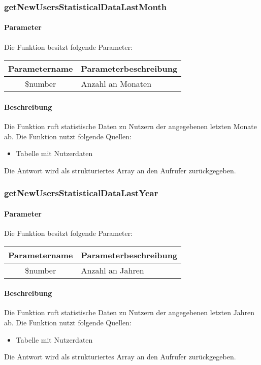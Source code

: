 \subsubsection{getNewUsersStatisticalDataLastMonth}
\paragraph{Parameter} Die Funktion besitzt folgende Parameter:
\begin{table}[H]
	\begin{tabular}{|c|p{11cm}|}
		\hline
		\textbf{Parametername} & \textbf{Parameterbeschreibung} \\ \hline
		\$number & Anzahl an Monaten \\ \hline
	\end{tabular}
\end{table}
\paragraph{Beschreibung} Die Funktion ruft statistische Daten zu Nutzern der angegebenen letzten Monate ab. Die Funktion nutzt folgende Quellen:
\begin{itemize}
	\item Tabelle mit Nutzerdaten
\end{itemize}
Die Antwort wird als strukturiertes Array an den Aufrufer zurückgegeben.
\subsubsection{getNewUsersStatisticalDataLastYear}
\paragraph{Parameter} Die Funktion besitzt folgende Parameter:
\begin{table}[H]
	\begin{tabular}{|c|p{11cm}|}
		\hline
		\textbf{Parametername} & \textbf{Parameterbeschreibung} \\ \hline
		\$number & Anzahl an Jahren \\ \hline
	\end{tabular}
\end{table}
\paragraph{Beschreibung} Die Funktion ruft statistische Daten zu Nutzern der angegebenen letzten Jahren ab. Die Funktion nutzt folgende Quellen:
\begin{itemize}
	\item Tabelle mit Nutzerdaten
\end{itemize}
Die Antwort wird als strukturiertes Array an den Aufrufer zurückgegeben.
